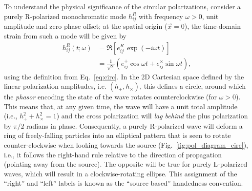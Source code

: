 \documentclass[aps,prd,twocolumn,superscriptaddress,preprintnumbers,floatfix,nofootinbib]{revtex4-2}
\begin{document}
To understand the physical significance of the circular polarizations,
consider a purely R-polarized monochromatic mode $h^R_{ij}$ with frequency $\omega > 0$, unit amplitude and zero phase offset; at the spatial origin ($\vec{x}=0$), the time-domain strain from such a mode will be given by
\begin{align} \label{eq:circ_example}
h_{ij}^R(t;\omega) &= \Re \left[ e^R_{ij}\, \exp(-i\omega t) \right] \nonumber\\
&= \frac{1}{\sqrt{2}} \left( e^+_{ij} \cos \omega t + e^\times_{ij} \sin \omega t \right) ,
\end{align}
using the definition from Eq.~\eqref{eq:circ}.
In the 2D Cartesian space defined by the linear polarization amplitudes, i.e. $\left(h_+, h_\times\right)$, this defines a circle, around which the \emph{phasor} encoding the state of the wave rotates counterclockwise (for $\omega > 0$).
This means that, at any given time, the wave will have a unit total amplitude (i.e., $h^2_+ + h^2_\times=1$) and the cross polarization will \emph{lag behind} the plus polarization by $\pi/2$ radians in phase.
%
Consequently, a purely R-polarized wave will deform a ring of freely-falling particles into an elliptical pattern that is seen to rotate counter-clockwise when looking towards the source (Fig.~\ref{fig:pol_diagram_circ}), i.e., it follows the right-hand rule relative to the direction of propagation (pointing away from the source).
The opposite will be true for purely L-polarized waves, which will result in a clockwise-rotating ellipse.
This assignment of the ``right'' and ``left'' labels is known as the ``source based'' handedness convention.
\end{document}
